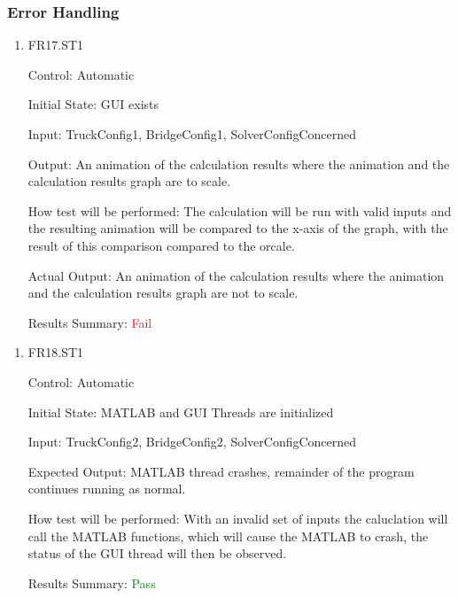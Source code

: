 \documentclass[12pt, titlepage]{article}
\begin{document}
\subsubsection{Error Handling}
\begin{enumerate}

  \item{FR17.ST1\\}
  
  Control: Automatic
            
  Initial State: GUI exists
            
  Input: TruckConfig1, BridgeConfig1, SolverConfigConcerned
            
  Output: An animation of the calculation results where the animation and the calculation results graph are to scale.
  
  How test will be performed: The calculation will be run with valid inputs and the resulting animation will be compared to the x-axis of the graph, with the result of this comparison compared to the orcale.

  Actual Output: An animation of the calculation results where the animation and the calculation results graph are not to scale.

  Results Summary: \textcolor{red} {Fail}
   
\end{enumerate}
\begin{enumerate}
  \item{FR18.ST1\\}
  
  Control: Automatic
            
  Initial State: MATLAB and GUI Threads are initialized
            
  Input: TruckConfig2, BridgeConfig2, SolverConfigConcerned
            
  Expected Output: MATLAB thread crashes, remainder of the program continues running as normal. 
  
  How test will be performed: With an invalid set of inputs the caluclation will call the MATLAB functions, which will cause the MATLAB to crash, the status of the GUI thread will then be observed.
  
  Results Summary: \textcolor{green} {Pass}
  
\end{enumerate}
\end{document}
